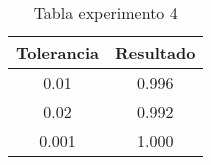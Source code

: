 \begin{table}[!ht]
\begin{center}
\begin{tabular}{|c|c|}\hline
{\bf Tolerancia} & {\bf Resultado}\\ \hline
0.01 & 0.996\\
0.02 & 0.992\\
0.001 & 1.000\\
\hline
\end{tabular}
\end{center}
\caption{Tabla experimento 4}
\label{Mitabla4}
\end{table}